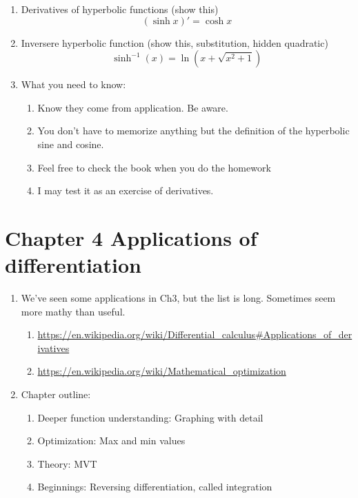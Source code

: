 \documentclass{article}
\begin{document}
\begin{enumerate}
\item Derivatives of hyperbolic functions (show this)
$$
(\sinh x)' = \cosh x
$$

\item Inversere hyperbolic function (show this, substitution, hidden quadratic)
$$
\sinh^{-1}(x) = \ln (x+\sqrt{x^2+1})
$$

\item What you need to know:
\begin{enumerate}
\item Know they come from application. Be aware.
\item You don't have to memorize anything but the definition of the hyperbolic sine and cosine.
\item Feel free to check the book when you do the homework
\item I may test it as an exercise of derivatives.
\end{enumerate}
\end{enumerate}


\section{Chapter 4 Applications of differentiation}

\begin{enumerate}
\item We've seen some applications in Ch3, but the list is long. Sometimes seem more mathy than useful.
\begin{enumerate}
\item \url{https://en.wikipedia.org/wiki/Differential_calculus#Applications_of_derivatives}
\item \url{https://en.wikipedia.org/wiki/Mathematical_optimization}
\end{enumerate}

\item Chapter outline:
\begin{enumerate}
\item Deeper function understanding: Graphing with detail
\item Optimization: Max and min values
\item Theory: MVT
\item Beginnings: Reversing differentiation, called integration
\end{enumerate}
\end{enumerate}
\end{document}
